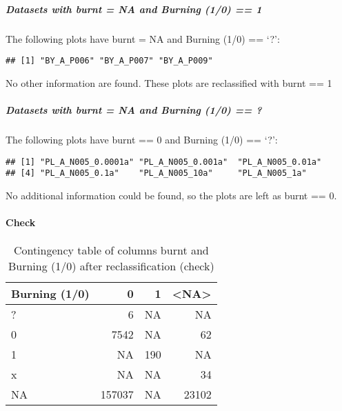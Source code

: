 \documentclass[table]{article}
\newenvironment{Shaded}{\begin{snugshade}}{\end{snugshade}}
\newcommand{\KeywordTok}[1]{\textcolor[rgb]{0.13,0.29,0.53}{\textbf{#1}}}
\newcommand{\DataTypeTok}[1]{\textcolor[rgb]{0.13,0.29,0.53}{#1}}
\newcommand{\DecValTok}[1]{\textcolor[rgb]{0.00,0.00,0.81}{#1}}
\newcommand{\StringTok}[1]{\textcolor[rgb]{0.31,0.60,0.02}{#1}}
\newcommand{\OperatorTok}[1]{\textcolor[rgb]{0.81,0.36,0.00}{\textbf{#1}}}
\newcommand{\NormalTok}[1]{#1}
\let\oldparagraph\paragraph
\renewcommand{\paragraph}[1]{\oldparagraph{#1}\mbox{}}
\let\oldsubparagraph\subparagraph
\renewcommand{\subparagraph}[1]{\oldsubparagraph{#1}\mbox{}}
\begin{document}
\subparagraph{\texorpdfstring{\emph{Datasets with burnt = NA and Burning
(1/0) ==
1}}{Datasets with burnt = NA and Burning (1/0) == 1}}\label{datasets-with-burnt-na-and-burning-10-1}

The following plots have burnt = NA and Burning (1/0) == `?':

\begin{verbatim}
## [1] "BY_A_P006" "BY_A_P007" "BY_A_P009"
\end{verbatim}

No other information are found. These plots are reclassified with burnt
== 1

\begin{Shaded}
\end{Shaded}

\subparagraph{\texorpdfstring{\emph{Datasets with burnt = NA and Burning
(1/0) ==
?}}{Datasets with burnt = NA and Burning (1/0) == ?}}\label{datasets-with-burnt-na-and-burning-10}

The following plots have burnt == 0 and Burning (1/0) == `?':

\begin{verbatim}
## [1] "PL_A_N005_0.0001a" "PL_A_N005_0.001a"  "PL_A_N005_0.01a"  
## [4] "PL_A_N005_0.1a"    "PL_A_N005_10a"     "PL_A_N005_1a"
\end{verbatim}

No additional information could be found, so the plots are left as burnt
== 0.

\paragraph{Check}\label{check-2}

\begin{table}[H]

\caption{\label{tab:unnamed-chunk-36}Contingency table of columns burnt and Burning (1/0) after reclassification (check)}
\centering
\begin{tabular}[t]{l|r|r|r}
\hline
Burning (1/0) & 0 & 1 & <NA>\\
\hline
? & 6 & NA & NA\\
\hline
0 & 7542 & NA & 62\\
\hline
1 & NA & 190 & NA\\
\hline
x & NA & NA & 34\\
\hline
NA & 157037 & NA & 23102\\
\hline
\end{tabular}
\end{table}
\end{document}
